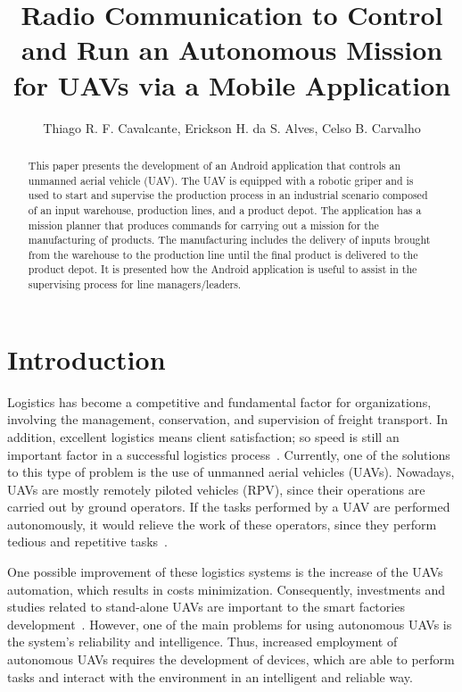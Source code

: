 \documentclass[12pt]{article}
\title{Radio Communication to Control and Run an Autonomous Mission for UAVs via a Mobile Application}
\author{Thiago R. F. Cavalcante\inst{1,2}, Erickson H. da S. Alves\inst{1,2}, Celso B. Carvalho\inst{2,3} }
\begin{document}
 

\maketitle

\begin{abstract}
  This paper presents the development of an Android application that controls an unmanned aerial vehicle (UAV). The UAV is equipped with a robotic griper and is used to start and supervise the production process in an industrial scenario composed of an input warehouse, production lines, and a product depot. The application has a mission planner that produces commands for carrying out a mission for the manufacturing of products. The manufacturing includes the delivery of inputs brought from the warehouse to the production line until the final product is delivered to the product depot. It is presented how the Android application is useful to assist in the supervising process for line managers/leaders.
\end{abstract}


\section{Introduction}
\label{sec:introduction}

Logistics has become a competitive and fundamental factor for organizations, involving the management, conservation, and supervision of freight transport. In addition, excellent logistics means client satisfaction; so speed is still an important factor in a successful logistics process~\cite{drone4logistic}. Currently, one of the solutions to this type of problem is the use of unmanned aerial vehicles (UAVs). Nowadays, UAVs are mostly remotely piloted vehicles (RPV), since their operations are carried out by ground operators. If the tasks performed by a UAV are performed autonomously, it would relieve the work of these operators, since they perform tedious and repetitive tasks~\cite{pascarella2013autonomic}.

One possible improvement of these logistics systems is the increase of the UAVs automation, which results in costs minimization. Consequently, investments and studies related to stand-alone UAVs are important to the smart factories development~\cite{hern2014dhl}. However, one of the main problems for using autonomous UAVs is the system's reliability and intelligence. Thus, increased employment of autonomous UAVs requires the development of devices, which are able to perform tasks and interact with the environment in an intelligent and reliable way.
\end{document}
